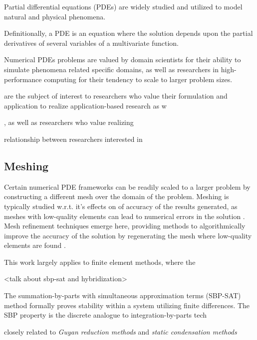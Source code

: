 
Partial differential equations (PDEs) are widely studied and utilized to model natural and physical phenomena. 

Definitionally, a PDE is an equation where the solution depends upon the partial derivatives of several variables of a multivariate function.



Numerical PDEs problems are valued by domain scientists for their ability to simulate phenomena related specific domains, as well as researchers in high-performance computing for their tendency to scale to larger problem sizes. 

are the subject of interest to researchers who value their formulation and application to realize application-based research as w

, as well as researchers who value realizing 

relationship between researchers interested in 

\subsection*{Meshing}
Certain numerical PDE frameworks can be readily scaled to a larger problem by constructing a different mesh over the domain of the problem. Meshing is typically studied w.r.t. it's effects on of accuracy of the results generated, as meshes with low-quality elements can lead to numerical errors in the solution \citep{sharma2021overset, dervieux2003theoretical}. Mesh refinement techniques emerge here, providing methods to algorithmically improve the accuracy of the solution by regenerating the mesh where low-quality elements are found \citep{berger1984adaptive, verfurth1994posteriori, geiersbach2020stochastic, bespalov2022error}. 




This work largely applies to finite element methods, where the


<talk about sbp-sat and hybridization> 

The summation-by-parts with simultaneous approximation terms (SBP-SAT) method formally proves stability within a system utilizing finite differences. The SBP property is the discrete analogue to integration-by-parts tech



closely related to \emph{Guyan reduction methods} and \emph{static condensation methods} \citep{guyan1965reduction, wilson1974static}

